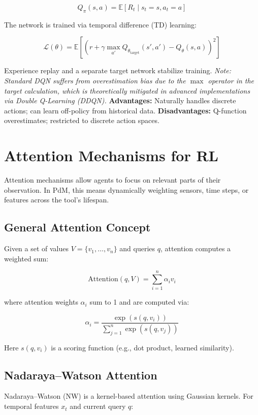 \documentclass[11pt]{article}
\begin{document}
\begin{equation}
Q_\pi(s,a) = \mathbb{E} \left[ R_t \mid s_t=s, a_t=a \right]
\end{equation}

The network is trained via temporal difference (TD) learning:

\begin{equation}
\mathcal{L}(\theta) = \mathbb{E} \left[ \left( r + \gamma \max_{a'} Q_{\theta_{\mathrm{target}}}(s', a') - Q_\theta(s, a) \right)^2 \right]
\end{equation}

Experience replay and a separate target network stabilize training. \textit{Note: Standard DQN suffers from overestimation bias due to the $\max$ operator in the target calculation, which is theoretically mitigated in advanced implementations via Double Q-Learning (DDQN).}
\textbf{Advantages:} Naturally handles discrete actions; can learn off-policy from historical data.
\textbf{Disadvantages:} Q-function overestimates; restricted to discrete action spaces.

\section{Attention Mechanisms for RL}
Attention mechanisms allow agents to focus on relevant parts of their observation. In PdM, this means dynamically weighting sensors, time steps, or features across the tool's lifespan.

\subsection{General Attention Concept}
Given a set of values $V = \{v_1, \ldots, v_n\}$ and queries $q$, attention computes a weighted sum:

\begin{equation}
\mathrm{Attention}(q, V) = \sum_{i=1}^{n} \alpha_i v_i
\end{equation}

where attention weights $\alpha_i$ sum to 1 and are computed via:

\begin{equation}
\alpha_i = \frac{\exp(s(q, v_i))}{\sum_{j=1}^{n} \exp(s(q, v_j))}
\end{equation}

Here $s(q, v_i)$ is a scoring function (e.g., dot product, learned similarity).

\subsection{Nadaraya--Watson Attention}
Nadaraya--Watson (NW) is a kernel-based attention using Gaussian kernels. For temporal features $x_t$ and current query $q$:
\end{document}
